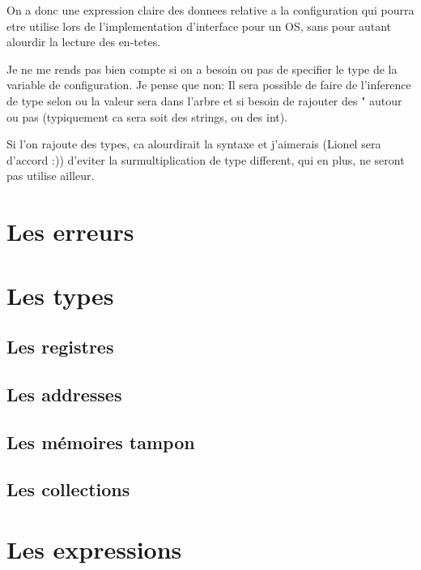 \documentclass{rtxreport}
\begin{document}
On a donc une expression claire des donnees relative a la configuration
qui pourra etre utilise lors de l'implementation d'interface pour un
OS, sans pour autant alourdir la lecture des en-tetes.

Je ne me rends pas bien compte si on a besoin ou pas de specifier
le type de la variable de configuration. Je pense que non:
Il sera possible de faire de l'inference de type selon
ou la valeur sera dans l'arbre et si besoin de rajouter des
" autour ou pas (typiquement ca sera soit des strings, ou des int).

Si l'on rajoute des types, ca alourdirait la syntaxe et j'aimerais
(Lionel sera d'accord :)) d'eviter la surmultiplication de type
different, qui en plus, ne seront pas utilise ailleur.



\chapter{Les erreurs}

\chapter{Les types}
\section{Les registres}
\section{Les addresses}
\section{Les mémoires tampon}
\section{Les collections}

\chapter{Les expressions}
\end{document}
